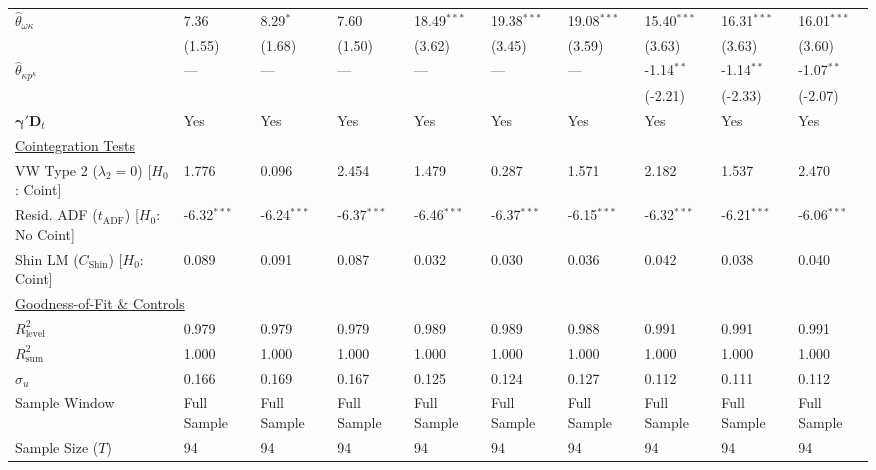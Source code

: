\begin{landscape}
\begin{table}[H]
\begin{tabular}{p{4.8cm}p{1.3cm}p{1.3cm}p{1.3cm}p{1.3cm}p{1.3cm}p{1.3cm}p{1.3cm}p{1.3cm}p{1.3cm}}
$\hat{\theta}_{\omega \kappa}$ & 7.36 & 8.29$^{*}$ & 7.60 & 18.49$^{***}$ & 19.38$^{***}$ & 19.08$^{***}$ & 15.40$^{***}$ & 16.31$^{***}$ & 16.01$^{***}$  \\
 & {\scriptsize (1.55)} & {\scriptsize (1.68)} & {\scriptsize (1.50)} & {\scriptsize (3.62)} & {\scriptsize (3.45)} & {\scriptsize (3.59)} & {\scriptsize (3.63)} & {\scriptsize (3.63)} & {\scriptsize (3.60)}  \\
$\hat{\theta}_{\kappa p^{\kappa}}$ & --- & --- & --- & --- & --- & --- & -1.14$^{**}$ & -1.14$^{**}$ & -1.07$^{**}$  \\
 &  &  &  &  &  &  & {\scriptsize (-2.21)} & {\scriptsize (-2.33)} & {\scriptsize (-2.07)}  \\
$\boldsymbol{\gamma}' \mathbf{D}_t$ & Yes & Yes & Yes & Yes & Yes & Yes & Yes & Yes & Yes  \\
\midrule
\multicolumn{10}{l}{\underline{Cointegration Tests}} \\
VW Type 2 ($\lambda_2 = 0$) [$H_0$: Coint] & 1.776 & 0.096 & 2.454 & 1.479 & 0.287 & 1.571 & 2.182 & 1.537 & 2.470  \\
Resid. ADF ($t_{\text{ADF}}$) [$H_0$: No Coint] & -6.32$^{***}$ & -6.24$^{***}$ & -6.37$^{***}$ & -6.46$^{***}$ & -6.37$^{***}$ & -6.15$^{***}$ & -6.32$^{***}$ & -6.21$^{***}$ & -6.06$^{***}$  \\
Shin LM ($C_{\text{Shin}}$) [$H_0$: Coint] & 0.089 & 0.091 & 0.087 & 0.032 & 0.030 & 0.036 & 0.042 & 0.038 & 0.040  \\
\midrule
\multicolumn{10}{l}{\underline{Goodness-of-Fit \& Controls}} \\
$R_{\text{level}}^2$ & 0.979 & 0.979 & 0.979 & 0.989 & 0.989 & 0.988 & 0.991 & 0.991 & 0.991  \\
$R_{\text{sum}}^2$ & 1.000 & 1.000 & 1.000 & 1.000 & 1.000 & 1.000 & 1.000 & 1.000 & 1.000  \\
$\hat{\sigma}_u$ & 0.166 & 0.169 & 0.167 & 0.125 & 0.124 & 0.127 & 0.112 & 0.111 & 0.112  \\
Sample Window & Full Sample & Full Sample & Full Sample & Full Sample & Full Sample & Full Sample & Full Sample & Full Sample & Full Sample  \\
Sample Size ($T$) & 94 & 94 & 94 & 94 & 94 & 94 & 94 & 94 & 94  \\
\bottomrule

\end{tabular}
\end{table}
\end{landscape}
